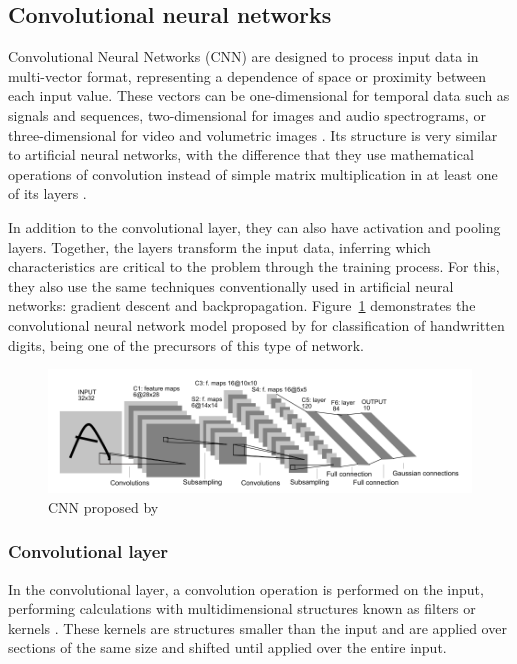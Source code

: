 \documentclass[a4paper,fleqn]{cas-sc}
\begin{document}
\subsection{Convolutional neural networks}
Convolutional Neural Networks (CNN) \cite{LeCun1998} are designed to process input data in multi-vector format, representing a dependence of space or proximity between each input value. These vectors can be one-dimensional for temporal data such as signals and sequences, two-dimensional for images and audio spectrograms, or three-dimensional for video and volumetric images \cite{LeCun2015deep}. Its structure is very similar to artificial neural networks, with the difference that they use mathematical operations of convolution instead of simple matrix multiplication in at least one of its layers \cite{Goodfellow-et-al-2016}.

In addition to the convolutional layer, they can also have activation and pooling layers. Together, the layers transform the input data, inferring which characteristics are critical to the problem through the training process. For this, they also use the same techniques conventionally used in artificial neural networks: gradient descent and backpropagation. Figure~\ref{fig:cnn} demonstrates the convolutional neural network model proposed by  for classification of handwritten digits, being one of the precursors of this type of network.

\begin{figure}[h!]
	\caption{CNN proposed by }
	\label{fig:cnn}
	\centering%
	\begin{minipage}{1\textwidth}
		\includegraphics[width=\textwidth]{images/cnn_lecun.png}
	\end{minipage}
\end{figure}

\subsubsection{Convolutional layer}
In the convolutional layer, a convolution operation is performed on the input, performing calculations with multidimensional structures known as filters or kernels \cite{aggarwal2018}. These kernels are structures smaller than the input and are applied over sections of the same size and shifted until applied over the entire input.
\end{document}
